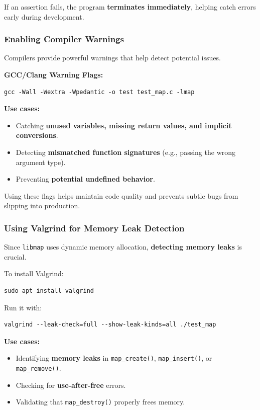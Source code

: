 \documentclass[titlepage]{article}
\begin{document}
If an assertion fails, the program \textbf{terminates immediately}, helping catch errors early during development.

\subsubsection{Enabling Compiler Warnings}

Compilers provide powerful warnings that help detect potential issues.

\textbf{GCC/Clang Warning Flags:}
\begin{verbatim}
gcc -Wall -Wextra -Wpedantic -o test test_map.c -lmap
\end{verbatim}

\textbf{Use cases:}
\begin{itemize}
    \item Catching \textbf{unused variables, missing return values, and implicit conversions}.
    \item Detecting \textbf{mismatched function signatures} (e.g., passing the wrong argument type).
    \item Preventing \textbf{potential undefined behavior}.
\end{itemize}

Using these flags helps maintain code quality and prevents subtle bugs from slipping into production.

\subsubsection{Using Valgrind for Memory Leak Detection}

Since \texttt{libmap} uses dynamic memory allocation, \textbf{detecting memory leaks} is crucial.

To install Valgrind:
\begin{verbatim}
sudo apt install valgrind
\end{verbatim}

Run it with:
\begin{verbatim}
valgrind --leak-check=full --show-leak-kinds=all ./test_map
\end{verbatim}

\textbf{Use cases:}
\begin{itemize}
    \item Identifying \textbf{memory leaks} in \texttt{map\_create()}, \texttt{map\_insert()}, or \texttt{map\_remove()}.
    \item Checking for \textbf{use-after-free} errors.
    \item Validating that \texttt{map\_destroy()} properly frees memory.
\end{itemize}
\end{document}
